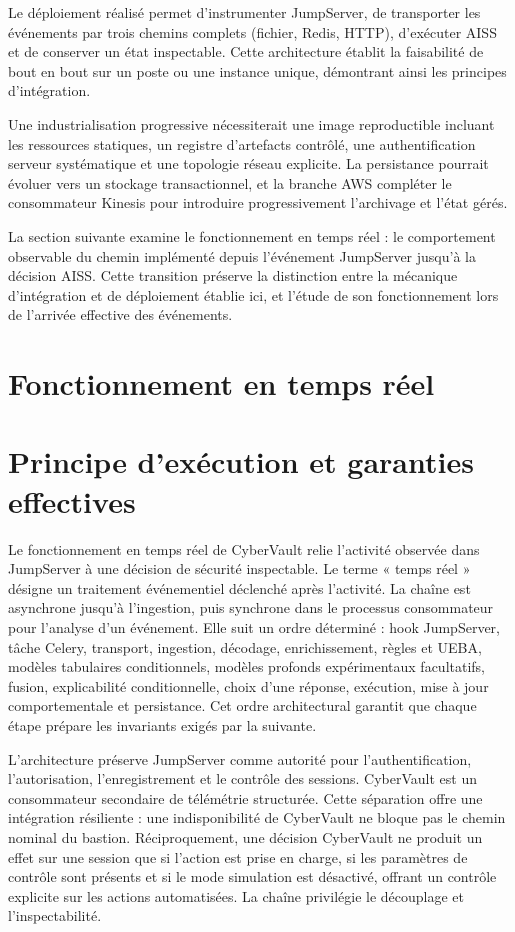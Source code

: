 \documentclass[11pt,a4paper,oneside]{report}
\theoremstyle{definition}
\theoremstyle{plain}
\begin{document}
Le déploiement réalisé permet d'instrumenter JumpServer, de transporter les
événements par trois chemins complets (fichier, Redis, HTTP), d'exécuter AISS
et de conserver un état inspectable. Cette architecture établit la faisabilité
de bout en bout sur un poste ou une instance unique, démontrant ainsi les
principes d'intégration.

Une industrialisation progressive nécessiterait une image reproductible
incluant les ressources statiques, un registre d'artefacts contrôlé, une
authentification serveur systématique et une topologie réseau explicite. La
persistance pourrait évoluer vers un stockage transactionnel, et la branche
AWS compléter le consommateur Kinesis pour introduire progressivement
l'archivage et l'état gérés.

La section suivante examine le fonctionnement en temps réel : le comportement
observable du chemin implémenté depuis l'événement JumpServer jusqu'à la
décision AISS. Cette transition préserve la distinction entre la mécanique
d'intégration et de déploiement établie ici, et l'étude de son fonctionnement
lors de l'arrivée effective des événements.



\section{Fonctionnement en temps réel}
\label{sec:impl-realtime}

\section{Principe d'exécution et garanties effectives}

Le fonctionnement en temps réel de CyberVault relie l'activité observée dans
JumpServer à une décision de sécurité inspectable. Le terme « temps réel »
désigne un traitement événementiel déclenché après l'activité. La chaîne est
asynchrone jusqu'à l'ingestion, puis synchrone dans le processus consommateur
pour l'analyse d'un événement. Elle suit un ordre déterminé : hook JumpServer,
tâche Celery, transport, ingestion, décodage, enrichissement, règles et UEBA,
modèles tabulaires conditionnels, modèles profonds expérimentaux facultatifs,
fusion, explicabilité conditionnelle, choix d'une réponse, exécution, mise à
jour comportementale et persistance. Cet ordre architectural garantit que
chaque étape prépare les invariants exigés par la suivante.

L'architecture préserve JumpServer comme autorité pour l'authentification,
l'autorisation, l'enregistrement et le contrôle des sessions. CyberVault est
un consommateur secondaire de télémétrie structurée. Cette séparation offre
une intégration résiliente : une indisponibilité de CyberVault ne bloque pas
le chemin nominal du bastion. Réciproquement, une décision CyberVault ne
produit un effet sur une session que si l'action est prise en charge, si les
paramètres de contrôle sont présents et si le mode simulation est désactivé,
offrant un contrôle explicite sur les actions automatisées. La chaîne
privilégie le découplage et l'inspectabilité.
\end{document}
